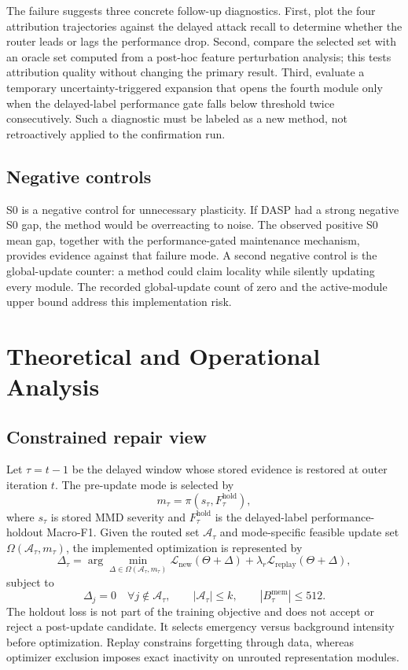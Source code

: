 The failure suggests three concrete follow-up diagnostics. First, plot the four attribution trajectories against the delayed attack recall to determine whether the router leads or lags the performance drop. Second, compare the selected set with an oracle set computed from a post-hoc feature perturbation analysis; this tests attribution quality without changing the primary result. Third, evaluate a temporary uncertainty-triggered expansion that opens the fourth module only when the delayed-label performance gate falls below threshold twice consecutively. Such a diagnostic must be labeled as a new method, not retroactively applied to the confirmation run.

\subsection{Negative controls}
S0 is a negative control for unnecessary plasticity. If DASP had a strong negative S0 gap, the method would be overreacting to noise. The observed positive S0 mean gap, together with the performance-gated maintenance mechanism, provides evidence against that failure mode. A second negative control is the global-update counter: a method could claim locality while silently updating every module. The recorded global-update count of zero and the active-module upper bound address this implementation risk.


\section{Theoretical and Operational Analysis}
\label{sec:theory-analysis}

\subsection{Constrained repair view}
Let $\tau=t-1$ be the delayed window whose stored evidence is restored at outer iteration $t$. The pre-update mode is selected by
\begin{equation}
m_{\tau}=\pi\!\left(s_{\tau},F^{\mathrm{hold}}_{\tau}\right),
\end{equation}
where $s_{\tau}$ is stored MMD severity and $F^{\mathrm{hold}}_{\tau}$ is the delayed-label performance-holdout Macro-F1. Given the routed set $\mathcal A_{\tau}$ and mode-specific feasible update set $\Omega(\mathcal A_{\tau},m_{\tau})$, the implemented optimization is represented by
\begin{equation}
\Delta_{\tau}=\arg\min_{\Delta\in\Omega(\mathcal A_{\tau},m_{\tau})}
\mathcal L_{\mathrm{new}}(\Theta+\Delta)+\lambda_r\mathcal L_{\mathrm{replay}}(\Theta+\Delta),
\end{equation}
subject to
\begin{equation}
\Delta_j=0\quad\forall j\notin\mathcal A_{\tau},\qquad
|\mathcal A_{\tau}|\leq k,
\qquad |B_{\tau}^{\mathrm{mem}}|\leq512.
\end{equation}
The holdout loss is not part of the training objective and does not accept or reject a post-update candidate. It selects emergency versus background intensity before optimization. Replay constrains forgetting through data, whereas optimizer exclusion imposes exact inactivity on unrouted representation modules.


